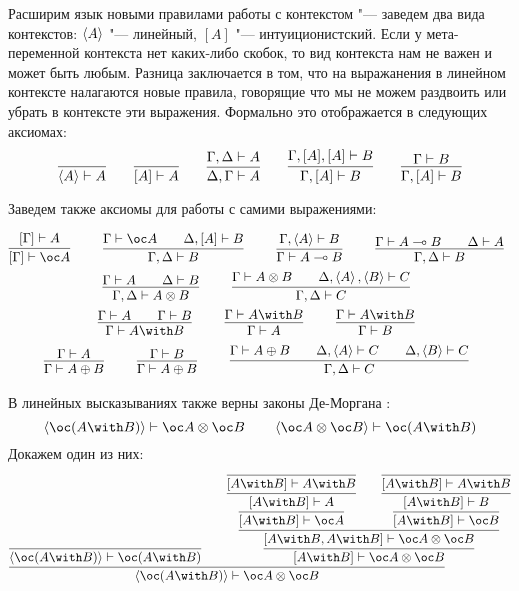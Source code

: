 Расширим язык новыми правилами работы с контекстом "--- заведем два вида контекстов: $\left<A\right>$ "--- линейный, $[A]$ "--- интуиционистский.
Если у мета-переменной контекста нет каких-либо скобок, то вид контекста нам не важен и может быть любым.
Разница заключается в том, что на выражанения в линейном контексте налагаются новые правила,
говорящие что мы не можем раздвоить или убрать в контексте эти выражения. Формально это отображается в следующих аксиомах:
\[
	\infer{\pair{A} \vdash A}{} \qquad
    \infer{[A] \vdash A}{} \qquad
    \infer{\Delta, \Gamma \vdash A}{\Gamma, \Delta \vdash A} \qquad
    \infer{\Gamma, [A] \vdash B}{\Gamma, [A], [A] \vdash B} \qquad
    \infer{\Gamma, [A] \vdash B}{\Gamma \vdash B} \\
\]

Заведем также аксиомы для работы с самими выражениями:
\begin{@empty}
\inferspacing
\begin{gather*}
	\infer[]{[\Gamma] \vdash \oc A}{[\Gamma] \vdash A} \qquad
	\infer[]{\Gamma, \Delta \vdash B}{\Gamma \vdash \oc A && \Delta, [A] \vdash B} \qquad
	\infer[]{\Gamma \vdash A \multimap B}{\Gamma, \pair{A} \vdash B} \qquad
	\infer[]{\Gamma, \Delta \vdash B}{\Gamma \vdash A \multimap B && \Delta \vdash A} \\
	\infer[]{\Gamma, \Delta \vdash A \otimes B}{\Gamma \vdash A && \Delta \vdash B} \qquad
	\infer[]{\Gamma, \Delta \vdash C}{\Gamma \vdash A \otimes B && \Delta, \pair{A}, \pair{B} \vdash C} \\
	\infer[]{\Gamma \vdash A \with B}{\Gamma \vdash A && \Gamma \vdash B} \qquad
	\infer[]{\Gamma \vdash A}{\Gamma \vdash A \with B} \qquad
	\infer[]{\Gamma \vdash B}{\Gamma \vdash A \with B} \\
	\infer[]{\Gamma \vdash A \oplus B}{\Gamma \vdash A} \qquad
	\infer[]{\Gamma \vdash A \oplus B}{\Gamma \vdash B} \qquad
	\infer[]{\Gamma, \Delta \vdash C}{\Gamma \vdash A \oplus B && \Delta, \pair{A} \vdash C && \Delta, \pair{B} \vdash C}
\end{gather*}
\end{@empty}
\begin{example}
В линейных высказываниях также верны законы Де-Моргана :
\[
	\pair{\oc (A \with B)} \vdash \oc A \otimes \oc B \qquad
	\pair{\oc A \otimes \oc B} \vdash \oc (A \with B)
\]
Докажем один из них:
\[
	\infer{\pair{\oc (A \with B)} \vdash \oc A \otimes \oc B} {
		\infer{\pair{\oc (A \with B)} \vdash \oc (A \with B)}{}
        &&
        \infer{[A \with B] \vdash \oc A \otimes \oc B} {
            \infer{[A \with B, A \with B] \vdash \oc A \otimes \oc B}{
                \infer{[A \with B] \vdash \oc A} {
                    \infer{[A \with B] \vdash A} {
                        \infer{[A \with B] \vdash A \with B}{}
                    }
                }
                &&
                \infer{[A \with B] \vdash \oc B} {
                    \infer{[A \with B] \vdash B} {
                        \infer{[A \with B] \vdash A \with B}{}
                    }
                }
            }
        }
    }
\]
\end{example}

